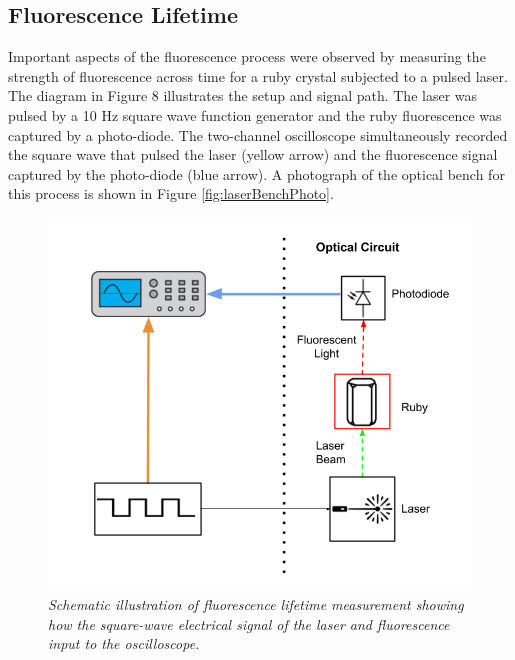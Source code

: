 \documentclass[11pt, a4paper, twocolumn]{article}
\begin{document}
\subsection*{Fluorescence Lifetime}
Important aspects of the fluorescence process were observed by measuring the strength of fluorescence across time for a ruby crystal subjected to a pulsed laser. The diagram in Figure 8 illustrates the setup and signal path. The laser was pulsed by a 10 Hz square wave function generator and the ruby fluorescence was captured by a photo-diode. The two-channel oscilloscope simultaneously recorded the square wave that pulsed the laser (yellow arrow) and the fluorescence signal captured by the photo-diode (blue arrow). A photograph of the optical bench for this process is shown in Figure \ref{fig:laserBenchPhoto}.
\begin{figure}[]
\includegraphics[width=\linewidth]{decayMeasurementSchematic.png}
\caption{\textit{Schematic illustration of fluorescence lifetime measurement showing how the square-wave electrical signal of the laser and fluorescence input to the oscilloscope.}}
\label{fig:decayMeasurementSchematic}
\end{figure}
\end{document}
